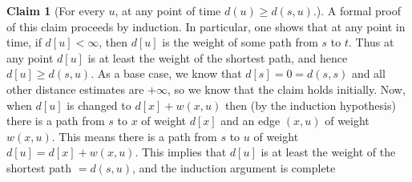 \documentclass [12pt]{article}
\theoremstyle{definition}
\newtheorem{claim}{Claim}
\begin{document}
\begin{claim}[For every $u$, at any point of time $d(u) \geq d(s, u)$.]
\vspace{1em}
A formal proof of this claim proceeds by induction. In particular, one shows that at any point in time, if $d[u] < \infty$, then $d[u]$ is the weight of some path from $s$ to $t$. Thus at any point $d[u]$ is at least the weight of the shortest path, and hence $d[u] \geq d(s, u)$. As a base case, we know that $d[s] = 0 = d(s, s)$ and all other distance estimates are $+\infty$, so we know that the claim holds initially. Now, when $d[u]$ is changed to $d[x] + w(x, u)$ then (by the induction hypothesis) there is a path from $s$ to $x$ of weight $d[x]$ and an edge $(x, u)$ of weight $w(x, u)$. This means there is a path from $s$ to $u$ of weight $d[u] = d[x] + w(x, u)$. This implies that $d[u]$ is at least the weight of the shortest path $= d(s, u)$, and the induction argument is complete
\end{claim}
\end{document}
